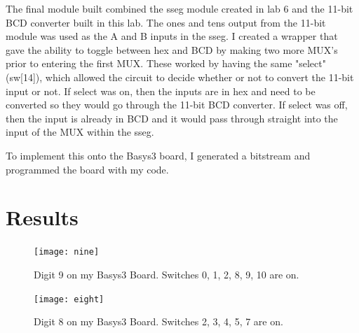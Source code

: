 \documentclass[11pt]{article}
\begin{document}
The final module built combined the sseg module created in lab 6 and the 11-bit BCD converter built in this lab. The ones and tens output from the 11-bit module was used as the A and B inputs in the sseg. I created a wrapper that gave the ability to toggle between hex and BCD by making two more MUX's prior to entering the first MUX. These worked by having the same "select" (sw[14]), which allowed the circuit to decide whether or not to convert the 11-bit input or not. If select was on, then the inputs are in hex and need to be converted so they would go through the 11-bit BCD converter. If select was off, then the input is already in BCD and it would pass through straight into the input of the MUX within the sseg. 

To implement this onto the Basys3 board, I generated a bitstream and programmed the board with my code.

\FloatBarrier

\section*{Results}

\begin{figure}[ht]\centering
\texttt{[image: nine]}
	\caption{Digit 9 on my Basys3 Board. Switches 0, 1, 2, 8, 9, 10 are on.}
	\label{fig:sim_with_table}
\end{figure}

\begin{figure}[ht]\centering
\texttt{[image: eight]}
	\caption{Digit 8 on my Basys3 Board. Switches 2, 3, 4, 5, 7 are on.}
	\label{fig:sim_with_table}
\end{figure}
\end{document}
